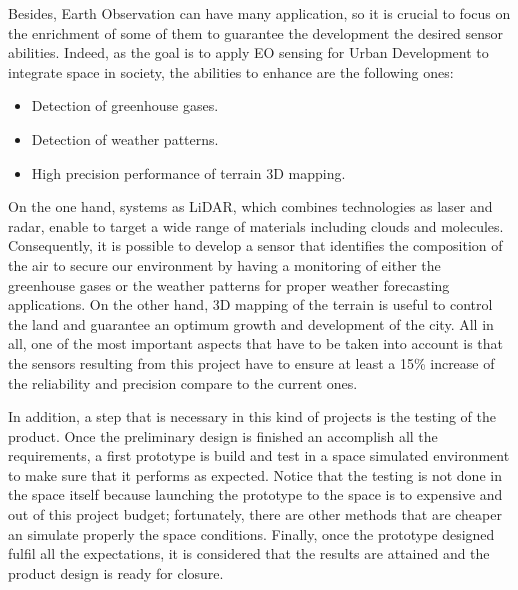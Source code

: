 Besides, Earth Observation can have many application, so it is crucial to focus on the enrichment of some of them to guarantee the development the desired sensor abilities. Indeed, as the goal is to apply EO sensing for Urban Development to integrate space in society, the abilities to enhance are the following ones:
\begin{itemize}
	\item Detection of greenhouse gases. 
	\item Detection of weather patterns.
	\item High precision performance of terrain 3D mapping. 
\end{itemize} 
On the one hand, systems as LiDAR, which combines technologies as laser and radar, enable to target a wide range of materials including clouds and molecules. Consequently, it is possible to develop a sensor that identifies the composition of the air to secure our environment by having a monitoring of either the greenhouse gases or the weather patterns for proper weather forecasting applications. On the other hand, 3D mapping of the terrain is useful to control the land and guarantee an optimum growth and development of the city. All in all, one of the most important aspects that have to be taken into account is that the sensors resulting from this project have to ensure at least a 15\% increase of the reliability and precision compare to the current ones.  

In addition, a step that is necessary in this kind of projects is the testing of the product. Once the preliminary design is finished an accomplish all the requirements, a first prototype is build and test in a space simulated environment to make sure that it performs as expected. Notice that the testing is not done in the space itself because launching the prototype to the space is to expensive and out of this project budget; fortunately, there are other methods that are cheaper an simulate properly the space conditions. Finally, once the prototype designed fulfil all the expectations, it is considered that the results are attained and the product design is ready for closure. 